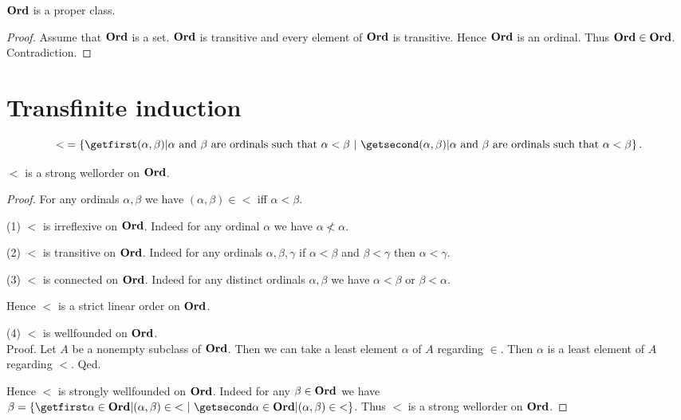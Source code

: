 \documentclass[../../set-theory/set-theory.tex]{subfiles}
\begin{document}
  \begin{forthel}
    \begin{theorem}
      $\mathbf{Ord}$ is a proper class.
    \end{theorem}
    \begin{proof}
      Assume that $\mathbf{Ord}$ is a set.
      $\mathbf{Ord}$ is transitive and every element of $\mathbf{Ord}$ is transitive.
      Hence $\mathbf{Ord}$ is an ordinal.
      Thus $\mathbf{Ord} \in \mathbf{Ord}$.
      Contradiction.
    \end{proof}
  \end{forthel}


  \section{Transfinite induction}

  \begin{forthel}
    \begin{definition}
      \[ {<} = \class{(\alpha, \beta) | \text{$\alpha$ and $\beta$ are ordinals
      such that $\alpha < \beta$}}. \]
    \end{definition}
  \end{forthel}

  \begin{forthel}
    \begin{proposition}
      ${<}$ is a strong wellorder on $\mathbf{Ord}$.
    \end{proposition}
    \begin{proof}
      For any ordinals $\alpha, \beta$ we have $(\alpha,\beta) \in {<}$ iff
      $\alpha < \beta$.

      (1) ${<}$ is irreflexive on $\mathbf{Ord}$.
      Indeed for any ordinal $\alpha$ we have $\alpha \nless \alpha$.

      (2) ${<}$ is transitive on $\mathbf{Ord}$.
      Indeed for any ordinals $\alpha, \beta, \gamma$ if $\alpha < \beta$ and
      $\beta < \gamma$ then $\alpha < \gamma$.

      (3) ${<}$ is connected on $\mathbf{Ord}$.
      Indeed for any distinct ordinals $\alpha, \beta$ we have $\alpha < \beta$
      or $\beta < \alpha$.

      Hence ${<}$ is a strict linear order on $\mathbf{Ord}$.

      (4) ${<}$ is wellfounded on $\mathbf{Ord}$. \\
      Proof.
        Let $A$ be a nonempty subclass of $\mathbf{Ord}$.
        Then we can take a least element $\alpha$ of $A$ regarding ${\in}$.
        Then $\alpha$ is a least element of $A$ regarding ${<}$.
      Qed.

      Hence ${<}$ is strongly wellfounded on $\mathbf{Ord}$.
      Indeed for any $\beta \in \mathbf{Ord}$ we have $\beta = \class{\alpha \in \Ord |
      (\alpha,\beta) \in {<}}$.
      Thus ${<}$ is a strong wellorder on $\mathbf{Ord}$.
    \end{proof}
  \end{forthel}
\end{document}
